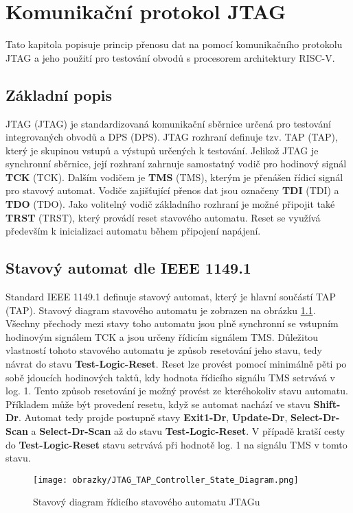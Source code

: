 \chapter{Komunikační protokol JTAG}
Tato kapitola popisuje princip přenosu dat na pomocí komunikačního protokolu JTAG a jeho použití pro testování obvodů s procesorem architektury RISC-V.

\section{Základní popis}
\acs{JTAG} (\acl{JTAG}) je standardizovaná komunikační sběrnice určená pro testování integrovaných obvodů a \acs{DPS} (\acl{DPS}).
\acs{JTAG} rozhraní definuje tzv. \acs{TAP} (\acl{TAP}), který je skupinou vstupů a výstupů určených k testování. Jelikož \acs{JTAG} je synchronní sběrnice, její rozhraní zahrnuje samostatný vodič pro hodinový signál \textbf{\acs{TCK}} (\acl{TCK}). Dalším vodičem je \textbf{\acs{TMS}} (\acl{TMS}), kterým je přenášen řídicí signál pro stavový automat. Vodiče zajišťující přenos dat jsou označeny \textbf{\acs{TDI}} (\acl{TDI}) a \textbf{\acs{TDO}} (\acl{TDO}). Jako volitelný vodič základního rozhraní je možné připojit také \textbf{\acs{TRST}} (\acl{TRST}), který provádí reset stavového automatu. Reset se využívá především k inicializaci automatu během připojení napájení. \cite {IEEE_1149-1} \cite{JTAG}      

\section{Stavový automat dle IEEE 1149.1}
Standard IEEE 1149.1 definuje stavový automat, který je hlavní součástí \acs{TAP} (\acl{TAP}). Stavový diagram stavového automatu je zobrazen na obrázku \ref{fig:tap_controller}. Všechny přechody mezi stavy toho automatu jsou plně synchronní se vstupním hodinovým signálem \acs{TCK} a jsou určeny řídicím signálem \acs{TMS}. Důležitou vlastností tohoto stavového automatu je způsob resetování jeho stavu, tedy návrat do stavu \textbf{Test-Logic-Reset}. Reset lze provést pomocí minimálně pěti po sobě jdoucích hodinových taktů, kdy hodnota řídicího signálu \acs{TMS} setrvává v log. 1. Tento způsob resetování je možný provést ze kteréhokoliv stavu automatu. Příkladem může být provedení resetu, když se automat nachází ve stavu \textbf{Shift-Dr}. Automat tedy projde postupně stavy \textbf{Exit1-Dr}, \textbf{Update-Dr}, \textbf{Select-Dr-Scan} a \textbf{Select-Dr-Scan} až do stavu \textbf{Test-Logic-Reset}. V případě kratší cesty do \textbf{Test-Logic-Reset} stavu setrvává při hodnotě log. 1 na signálu \acs{TMS} v tomto stavu.
\begin{figure}[!h]
  \begin{center}
    \texttt{[image: obrazky/JTAG\_TAP\_Controller\_State\_Diagram.png]}
  \end{center}
  \caption{Stavový diagram řídicího stavového automatu JTAGu \cite{JTAG_TAP_diagram}}
	\label{fig:tap_controller}
\end{figure}
